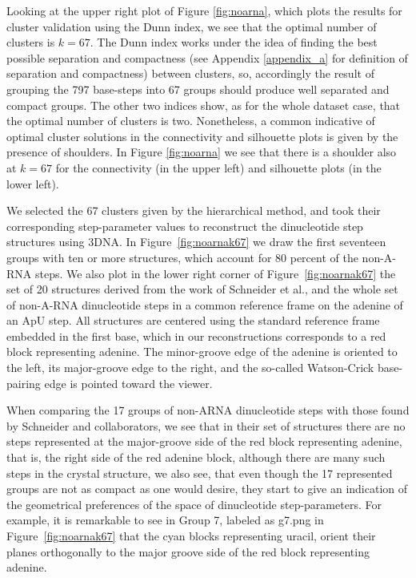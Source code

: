 Looking  at the  upper right  plot of  Figure  \ref{fig:noarna}, which
plots the results for cluster  validation using the Dunn index, we see
that the  optimal number of clusters  is $k=67$. The  Dunn index works
under the idea of finding the best possible separation and compactness
(see  Appendix  \ref{appendix_a}  for  definition  of  separation  and
compactness) between clusters, so,  accordingly the result of grouping
the 797  base-steps into 67  groups should produce well  separated and
compact groups. The  other two indices show, as  for the whole dataset
case,  that the  optimal number  of  clusters is  two. Nonetheless,  a
common indicative of optimal cluster solutions in the connectivity and
silhouette  plots is  given by  the presence  of shoulders.  In Figure
\ref{fig:noarna} we  see that there is  a shoulder also  at $k=67$ for
the  connectivity (in  the upper  left) and  silhouette plots  (in the
lower left).

We selected the 67 clusters given by the hierarchical method, and took
their   corresponding  step-parameter   values   to  reconstruct   the
dinucleotide      step       structures      using      3DNA.       In
Figure~\ref{fig:noarnak67} we draw the first seventeen groups with ten
or  more structures,  which account  for 80  percent of  the non-A-RNA
steps.    We    also   plot   in    the   lower   right    corner   of
Figure~\ref{fig:noarnak67} the  set of 20 structures  derived from the
work  of Schneider et  al.\cite{schneider2004}, and  the whole  set of
non-A-RNA  dinucleotide  steps in  a  common  reference  frame on  the
adenine  of  an ApU  step.   All  structures  are centered  using  the
standard  reference frame  embedded in  the first  base, which  in our
reconstructions corresponds  to a red block  representing adenine. The
minor-groove  edge  of  the  adenine  is oriented  to  the  left,  its
major-groove  edge  to  the  right,  and  the  so-called  Watson-Crick
base-pairing edge is pointed toward the viewer.

When comparing the 17 groups of non-ARNA dinucleotide steps with those
found  by Schneider and  collaborators, we  see that  in their  set of
structures there are no steps  represented at the major-groove side of
the red block representing adenine, that is, the right side of the red
adenine  block, although  there are  many  such steps  in the  crystal
structure, we also see, that even though the 17 represented groups
are  not  as compact  as  one  would desire,  they  start  to give  an
indication of the geometrical preferences of the space of dinucleotide
step-parameters.  For  example, it  is remarkable to  see in  Group 7,
labeled as  g7.png in Figure~\ref{fig:noarnak67} that  the cyan blocks
representing  uracil, orient  their planes  orthogonally to  the major
groove side of the red block representing adenine.

